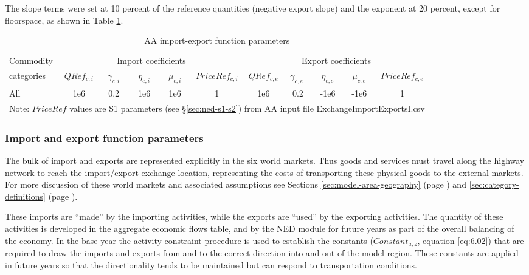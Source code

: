 The slope terms were set at 10 percent of the reference quantities (negative export slope) and the exponent at 20 percent, except for floorspace, as shown in Table \ref{tab:aa-ie-function-parameters}.

\begin{table}   %
\centering
\caption{AA import-export function parameters}\label{tab:aa-ie-function-parameters}
\begin{tabular}{lccccc|ccccc}
\hline
Commodity & \multicolumn{5}{c|}{Import coefficients} & \multicolumn{5}{c}{Export coefficients} \\
\cline{2-11}
categories & $QRef_{c,i}$ & ~$\gamma_{c,i}$~ & ~$\eta_{c,i}$~ & ~$\mu_{c,i}$~ & $PriceRef_{c,i}$ & $QRef_{c,e}$ & $~\gamma_{c,e}$~ & ~$\eta_{c,e}$~ & ~$\mu_{c,e}$~ & $PriceRef_{c,e}$ \\
\hline
All & 1e6 & 0.2 & 1e6 & 1e6 & 1 & 1e6 & 0.2 & -1e6 & -1e6 & 1 \\
\hline
\multicolumn{11}{l}{\footnotesize Note: $PriceRef$ values are S1 parameters (see \S\ref{sec:ned-s1-s2}) from AA input file ExchangeImportExportsI.csv}
\end{tabular}
\end{table}

\subsubsection{Import and export function parameters}
The bulk of import and exports are represented explicitly in the six world markets. Thus goods and services must travel along the highway network to reach the import/export exchange location, representing the costs of transporting these physical goods to the external markets. For more discussion of these world markets and associated assumptions see Sections \ref{sec:model-area-geography} (page \pageref{sec:model-area-geography}) and \ref{sec:category-definitions} (page \pageref{sec:category-definitions}).

These imports are ``made'' by the importing activities, while the exports are ``used'' by the exporting activities.  The quantity of these activities is developed in the aggregate economic flows table, and by the NED module for future years as part of the overall balancing of the economy. In the base year the activity constraint procedure is used to establish the constants ($Constant_{a,z}$, equation \ref{eq:6.02}) that are required to draw the imports and exports from and to the correct direction into and out of the model region. These constants are applied in future years so that the directionality tends to be maintained but can respond to transportation conditions.  

